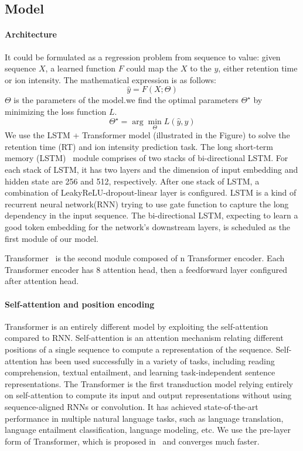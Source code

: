 
\subsection{Model}
\paragraph*{Architecture}
It could be formulated as a regression problem from sequence to value: given sequence \( X \), a learned
function \( F \) could map the \( X \) to the \( y \), either retention time or ion intensity. The mathematical expression is as follows:
\[ \hat{y} = F(X;\Theta) \]
$\Theta$ is the parameters of the model.we find the optimal parameters \( \Theta^\star\) by minimizing  the loss function \( L \).
\[ \Theta^\star = \arg\min_{\Theta} L(\hat{y}, y) \]
We use the LSTM + Transformer model (illustrated in the Figure) to solve the retention time (RT) and ion intensity prediction task.
The long short-term memory (LSTM)~\cite{hochreiter1997long} module comprises of two stacks of bi-directional LSTM. For each stack of LSTM, it has two layers and the dimension of input embedding and hidden state are 256 and 512, respectively. After one stack of LSTM, a combination of LeakyReLU-dropout-linear layer is configured. LSTM is a kind of recurrent neural network(RNN) trying to use gate function to capture the long dependency in the input sequence. The bi-directional LSTM, expecting to learn a good token embedding for the network's downstream layers, is scheduled as the first module of our model.

Transformer~\cite{vaswani2017attention} is the second module composed of n Transformer encoder.
Each Transformer encoder has 8 attention head, then a feedforward layer configured after attention head.

\paragraph*{Self-attention and position encoding}
Transformer is an entirely different model by exploiting the self-attention compared to RNN.
Self-attention is an attention mechanism relating different positions of a single sequence to compute a representation of the sequence. Self-attention has been used successfully in a variety of tasks, including reading
comprehension, textual entailment, and learning task-independent sentence representations.
The Transformer is the first transduction model relying entirely on self-attention to compute its input and output representations without using sequence-aligned RNNs or convolution. It has achieved state-of-the-art performance in multiple natural language tasks, such as language translation, language entailment classification, language modeling, etc. We use the pre-layer form of Transformer, which is proposed in~\cite{xiong2020layer} and converges much faster.

